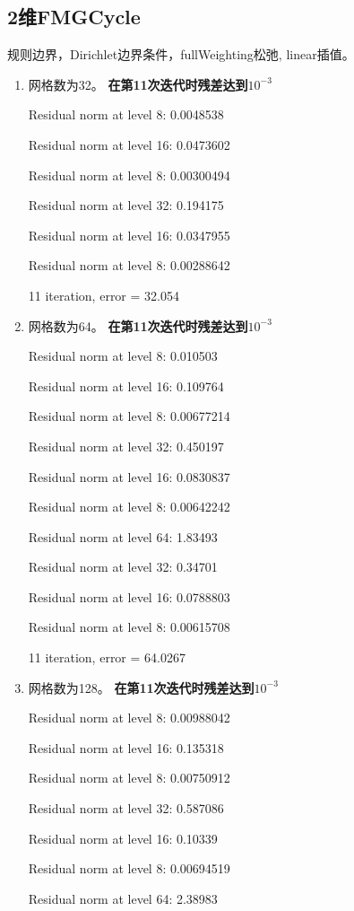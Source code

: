 \documentclass[UTF8]{ctexart}
\begin{document}
\subsection*{2维FMGCycle}
规则边界，Dirichlet边界条件，fullWeighting松弛, linear插值。
\begin{enumerate}
\item 网格数为32。
    \textbf{在第11次迭代时残差达到$10^{-3}$}

    Residual norm at level 8: 0.0048538

    Residual norm at level 16: 0.0473602

    Residual norm at level 8: 0.00300494

    Residual norm at level 32: 0.194175

    Residual norm at level 16: 0.0347955

    Residual norm at level 8: 0.00288642

    11 iteration, error = 32.054
\item 网格数为64。
    \textbf{在第11次迭代时残差达到$10^{-3}$}

    Residual norm at level 8: 0.010503

    Residual norm at level 16: 0.109764

    Residual norm at level 8: 0.00677214

    Residual norm at level 32: 0.450197

    Residual norm at level 16: 0.0830837

    Residual norm at level 8: 0.00642242

    Residual norm at level 64: 1.83493

    Residual norm at level 32: 0.34701

    Residual norm at level 16: 0.0788803

    Residual norm at level 8: 0.00615708

    11 iteration, error = 64.0267
\item 网格数为128。
    \textbf{在第11次迭代时残差达到$10^{-3}$}

    Residual norm at level 8: 0.00988042

    Residual norm at level 16: 0.135318

    Residual norm at level 8: 0.00750912

    Residual norm at level 32: 0.587086

    Residual norm at level 16: 0.10339

    Residual norm at level 8: 0.00694519

    Residual norm at level 64: 2.38983


\end{enumerate}
\end{document}
